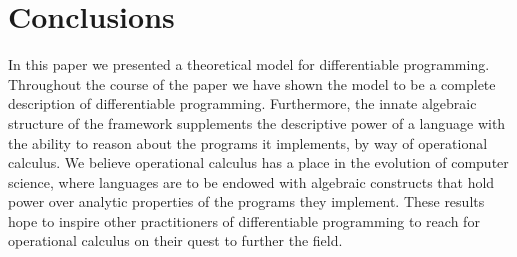 \section{Conclusions}

In this paper we presented a theoretical model for differentiable programming.
Throughout the course of the paper we have shown the model to be a complete description of differentiable programming.
Furthermore, the innate algebraic structure of the framework supplements the descriptive power of a language with the ability to reason about the programs it implements, by way of operational calculus.
We believe operational calculus has a place in the evolution of computer science, where languages are to be endowed with algebraic constructs that hold power over analytic properties of the programs they implement.
These results hope to inspire other practitioners of differentiable programming to reach for operational calculus on their quest to further the field. 
